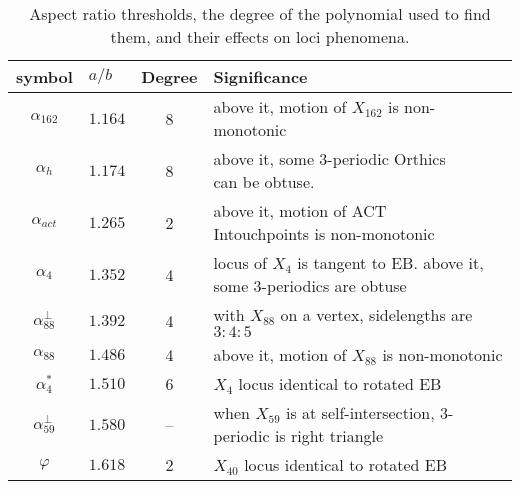 \begin{table}
\begin{center}
\small
\begin{tabular}{|c|l|c|l|}
\hline
symbol & $a/b$ & Degree & Significance \\
\hline
$\alpha_{162}$ & $1.164$ & 8 & above it, motion of $X_{162}$ is non-monotonic  \\ 
$\alpha_h$ & $1.174$ & 8 & \makecell[tl]{above it, some 3-periodic Orthics \\ can be obtuse.} \\ 
$\alpha_{act}$ & $1.265$ & 2 & \makecell[tl]{above it, motion of ACT\\Intouchpoints is non-monotonic} \\
$\alpha_4$ & $1.352$ & 4 & \makecell[tl]{locus of $X_4$ is tangent to EB.\\above it, some 3-periodics are obtuse} \\
$\alpha_{88}^{\perp}$ & $1.392$ & 4 & with $X_{88}$ on a vertex, sidelengths are $3:4:5$ \\
$\alpha_{88}$ & $1.486$ & 4 & above it, motion of $X_{88}$ is non-monotonic \\
$\alpha_4^{*}$ & $1.510$ & 6 & $X_4$ locus identical to rotated EB \\
$\alpha_{59}^{\perp}$ & $1.580$ & -- & \makecell[tl]{when $X_{59}$ is at self-intersection,\\3-periodic is right triangle}\\
$\varphi$ & $1.618$ & 2 & $X_{40}$ locus identical to rotated EB\\
\hline
\end{tabular}

\caption{Aspect ratio thresholds, the degree of the polynomial used to find them, and their effects on loci phenomena. \label{tab:loci-ab}}
\end{center}
\end{table}






